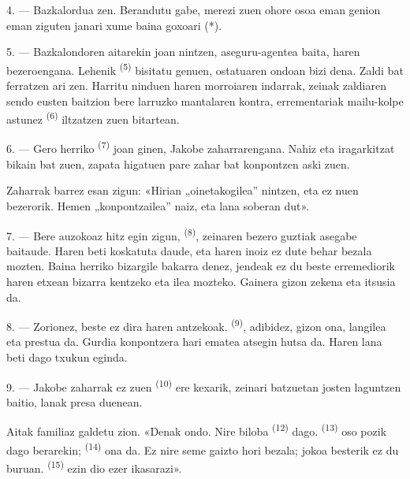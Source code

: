 4. --- Bazkalordua zen. Berandutu gabe, merezi zuen ohore osoa eman genion eman
ziguten janari xume baina goxoari (*).

\VUsaut{3.0mm}

5. --- Bazkalondoren aitarekin joan nintzen, aseguru-agentea baita, haren
bezeroengana. Lehenik  \textsuperscript{(5)} bisitatu genuen,
ostatuaren ondoan bizi dena. Zaldi bat ferratzen ari zen. Harritu ninduen haren
morroiaren indarrak, zeinak zaldiaren  sendo eusten baitzion bere
larruzko mantalaren kontra, errementariak mailu-kolpe astunez 
\textsuperscript{(6)} iltzatzen zuen bitartean.

6. --- Gero herriko  \textsuperscript{(7)} joan ginen,
Jakobe zaharrarengana. Nahiz eta iragarkitzat  bikain bat zuen,
zapata higatuen pare zahar bat konpontzen aski zuen.

Zaharrak barrez esan zigun: «Hirian „oinetakogilea” nintzen, eta ez nuen
bezerorik. Hemen „konpontzailea” naiz, eta lana soberan dut».

7. --- Bere auzokoaz hitz egin zigun,  \textsuperscript{(8)},
zeinaren bezero guztiak asegabe baitaude. Haren  beti koskatuta
daude, eta haren  inoiz ez dute behar bezala mozten. Baina
herriko bizargile bakarra denez, jendeak ez du beste erremediorik haren etxean
bizarra kentzeko eta ilea mozteko. Gainera gizon zekena eta itsusia da.

8. --- Zorionez, beste  ez dira haren antzekoak.
 \textsuperscript{(9)}, adibidez, gizon ona, langilea eta
prestua da. Gurdia konpontzera hari ematea atsegin hutsa da. Haren lana beti dago
txukun eginda.

9. --- Jakobe zaharrak ez zuen  \textsuperscript{(10)} ere
kexarik, zeinari batzuetan  josten laguntzen baitio, lanak presa
duenean.

Aitak familiaz galdetu zion. «Denak ondo. Nire biloba 
\textsuperscript{(12)} dago.  \textsuperscript{(13)} oso pozik
dago berarekin;  \textsuperscript{(14)} ona da. Ez nire seme
gaizto hori bezala; jokoa besterik ez du buruan. 
\textsuperscript{(15)} ezin dio ezer ikasarazi».

